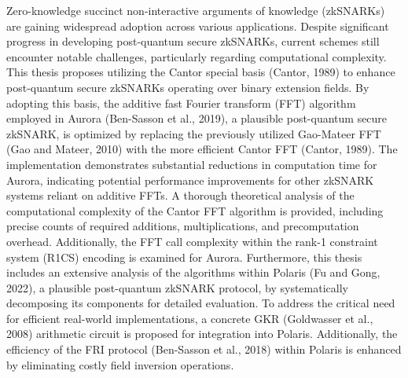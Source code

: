Zero-knowledge succinct non-interactive arguments of knowledge (zkSNARKs) are gaining widespread adoption across various applications. Despite significant progress in developing post-quantum secure zkSNARKs, current schemes still encounter notable challenges, particularly regarding computational complexity.
This thesis proposes utilizing the Cantor special basis (Cantor, 1989) to enhance post-quantum secure zkSNARKs operating over binary extension fields. By adopting this basis, the additive fast Fourier transform (FFT) algorithm employed in Aurora (Ben-Sasson et al., 2019), a plausible post-quantum secure zkSNARK, is optimized by replacing the previously utilized Gao-Mateer FFT (Gao and Mateer, 2010) with the more efficient Cantor FFT  (Cantor, 1989). The implementation demonstrates substantial reductions in computation time for Aurora, indicating potential performance improvements for other zkSNARK systems reliant on additive FFTs. A thorough theoretical analysis of the computational complexity of the Cantor FFT algorithm is provided, including precise counts of required additions, multiplications, and precomputation overhead. Additionally, the FFT call complexity within the rank-1 constraint system (R1CS) encoding is examined for Aurora.
Furthermore, this thesis includes an extensive analysis of the algorithms within Polaris (Fu and Gong, 2022), a plausible post-quantum zkSNARK protocol, by systematically decomposing its components for detailed evaluation. To address the critical need for efficient real-world implementations, a concrete GKR (Goldwasser et al., 2008) arithmetic circuit is proposed for integration into Polaris. Additionally, the efficiency of the FRI protocol (Ben-Sasson et al., 2018) within Polaris is enhanced by eliminating costly field inversion operations.

